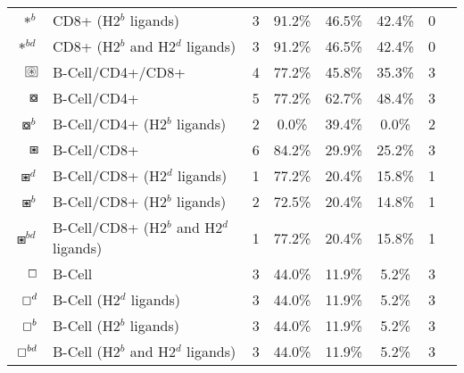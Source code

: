 \begin{tabular}{rllccccc}
                                          $ \ast^b $ &                    CD8+ (H2$^b$ ligands) &            3 &         91.2\% &          46.5\% &         42.4\% &                          0 \\
                                       $ \ast^{bd} $ &         CD8+ (H2$^b$ and H2$^d$ ligands) &            3 &         91.2\% &          46.5\% &         42.4\% &                          0 \\
 $ \setlength{\fboxsep}{0.5pt} \boxed{\circledast} $ &                         B-Cell/CD4+/CD8+ &            4 &         77.2\% &          45.8\% &         35.3\% &                          3 \\
                                      $ \boxcircle $ &                              B-Cell/CD4+ &            5 &         77.2\% &          62.7\% &         48.4\% &                          3 \\
                                    $ \boxcircle^b $ &             B-Cell/CD4+ (H2$^b$ ligands) &            2 &          0.0\% &          39.4\% &          0.0\% &                          2 \\
                                         $ \boxast $ &                              B-Cell/CD8+ &            6 &         84.2\% &          29.9\% &         25.2\% &                          3 \\
                                       $ \boxast^d $ &             B-Cell/CD8+ (H2$^d$ ligands) &            1 &         77.2\% &          20.4\% &         15.8\% &                          1 \\
                                       $ \boxast^b $ &             B-Cell/CD8+ (H2$^b$ ligands) &            2 &         72.5\% &          20.4\% &         14.8\% &                          1 \\
                                    $ \boxast^{bd} $ &  B-Cell/CD8+ (H2$^b$ and H2$^d$ ligands) &            1 &         77.2\% &          20.4\% &         15.8\% &                          1 \\
                                       $ \boxempty $ &                                   B-Cell &            3 &         44.0\% &          11.9\% &          5.2\% &                          3 \\
                                     $ \boxempty^d $ &                  B-Cell (H2$^d$ ligands) &            3 &         44.0\% &          11.9\% &          5.2\% &                          3 \\
                                     $ \boxempty^b $ &                  B-Cell (H2$^b$ ligands) &            3 &         44.0\% &          11.9\% &          5.2\% &                          3 \\
                                  $ \boxempty^{bd} $ &       B-Cell (H2$^b$ and H2$^d$ ligands) &            3 &         44.0\% &          11.9\% &          5.2\% &                          3 \\
\bottomrule
\end{tabular}
